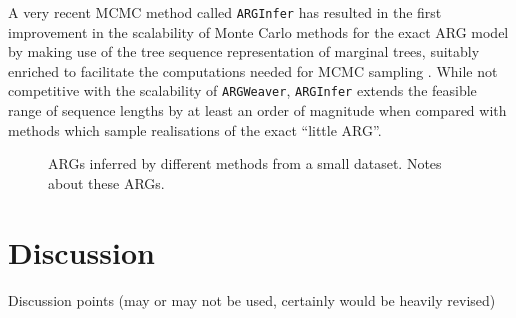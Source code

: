 \documentclass{article}
\begin{document}
A very recent MCMC method called \texttt{ARGInfer} has resulted in the first
improvement in the scalability of Monte Carlo methods for the exact ARG model
by making use of the tree sequence representation of marginal trees, suitably enriched
to facilitate the computations needed for MCMC sampling \citep{mahmoudi2021inference}.
While not competitive with the scalability of \texttt{ARGWeaver}, \texttt{ARGInfer} extends
the feasible range of sequence lengths by at least an order of magnitude when
compared with methods which sample realisations of the exact ``little ARG''.


\begin{figure}
\vspace{5em}
\caption{\label{fig-inferred-args}
ARGs inferred by different methods from a small dataset. Notes about these
ARGs.
}
\end{figure}

\section*{Discussion}

Discussion points (may or may not be used, certainly would be heavily revised)
\end{document}
